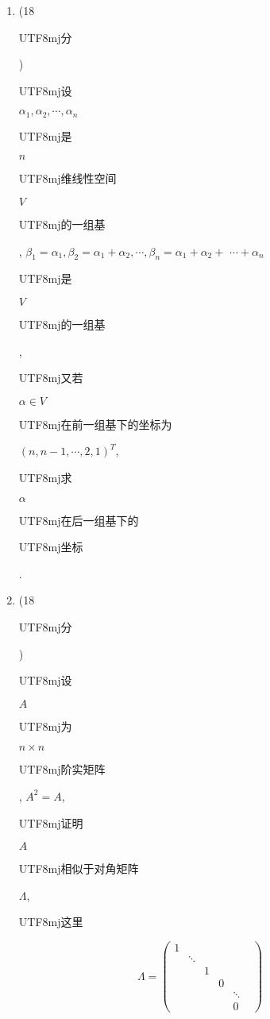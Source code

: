 \documentclass[10pt]{article}
\begin{document}
\begin{enumerate}
  \item (18 \begin{CJK}{UTF8}{mj}分\end{CJK}) \begin{CJK}{UTF8}{mj}设\end{CJK} $\alpha_{1}, \alpha_{2}, \cdots, \alpha_{n}$ \begin{CJK}{UTF8}{mj}是\end{CJK} $n$ \begin{CJK}{UTF8}{mj}维线性空间\end{CJK} $V$ \begin{CJK}{UTF8}{mj}的一组基\end{CJK}, $\beta_{1}=\alpha_{1}, \beta_{2}=\alpha_{1}+\alpha_{2}, \cdots, \beta_{n}=\alpha_{1}+\alpha_{2}+$ $\cdots+\alpha_{n}$ \begin{CJK}{UTF8}{mj}是\end{CJK} $V$ \begin{CJK}{UTF8}{mj}的一组基\end{CJK}, \begin{CJK}{UTF8}{mj}又若\end{CJK} $\alpha \in V$ \begin{CJK}{UTF8}{mj}在前一组基下的坐标为\end{CJK} $(n, n-1, \cdots, 2,1)^{T}$, \begin{CJK}{UTF8}{mj}求\end{CJK} $\alpha$ \begin{CJK}{UTF8}{mj}在后一组基下的\end{CJK} \begin{CJK}{UTF8}{mj}坐标\end{CJK}.

  \item (18 \begin{CJK}{UTF8}{mj}分\end{CJK}) \begin{CJK}{UTF8}{mj}设\end{CJK} $A$ \begin{CJK}{UTF8}{mj}为\end{CJK} $n \times n$ \begin{CJK}{UTF8}{mj}阶实矩阵\end{CJK}, $A^{2}=A$, \begin{CJK}{UTF8}{mj}证明\end{CJK} $A$ \begin{CJK}{UTF8}{mj}相似于对角矩阵\end{CJK} $\Lambda$, \begin{CJK}{UTF8}{mj}这里\end{CJK}

\end{enumerate}
$$
\Lambda=\left(\begin{array}{cccccc}
1 & & & & & \\
& \ddots & & & & \\
& & 1 & & & \\
& & & 0 & & \\
& & & & \ddots & \\
& & & & 0
\end{array}\right)
$$
\end{document}
